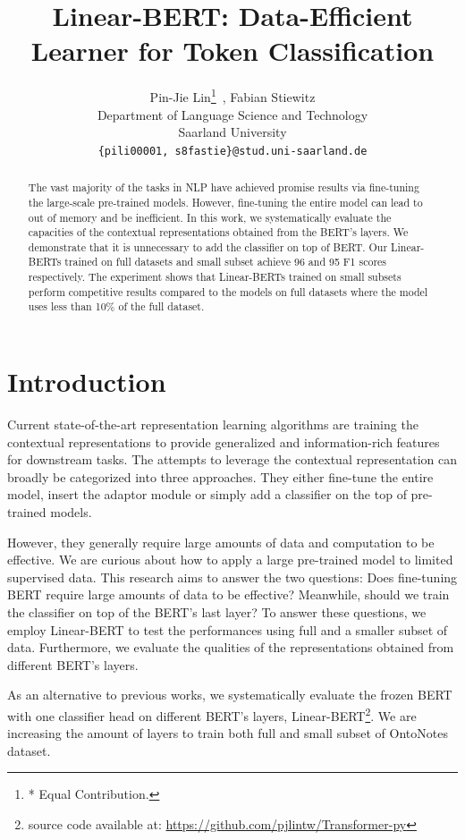 \documentclass[11pt,a4paper]{article}
\title{Linear-BERT: Data-Efficient Learner for Token Classification}
\author{Pin-Jie Lin\thanks{* Equal Contribution.}\ , Fabian Stiewitz\footnotemark[1] \\
  Department of Language Science and Technology \\
  Saarland University \\
  \texttt{\{pili00001, s8fastie\}@stud.uni-saarland.de}}
\date{}
\begin{document}
\maketitle
\begin{abstract}

The vast majority of the tasks in NLP have achieved promise results via fine-tuning the large-scale pre-trained models. However, fine-tuning the entire model can lead to out of memory and be inefficient. In this work, we systematically evaluate the capacities of the contextual representations obtained from the BERT's layers. We demonstrate that it is unnecessary to add the classifier on top of BERT. Our Linear-BERTs trained on full datasets and small subset achieve 96 and 95 F1 scores respectively. The experiment shows that Linear-BERTs trained on small subsets perform competitive results compared to the models on full datasets where the model uses less than 10\% of the full dataset.

\end{abstract}

\section{Introduction}

Current state-of-the-art representation learning algorithms are training the contextual representations to provide generalized and information-rich features for downstream tasks. The attempts to leverage the contextual representation can broadly be categorized into three approaches. They either fine-tune the entire model, insert the adaptor module or simply add a classifier on the top of pre-trained models. 

However, they generally require large amounts of data and computation to be effective. We are curious about how to apply a large pre-trained model to limited supervised data. This research aims to answer the two questions: Does fine-tuning BERT require large amounts of data to be effective? Meanwhile, should we train the classifier on top of the BERT's last layer? To answer these questions, we employ Linear-BERT to test the performances using full and a smaller subset of data. Furthermore, we evaluate the qualities of the representations obtained from different BERT's layers. 

As an alternative to previous works, we systematically evaluate the frozen BERT with one classifier head on different BERT's layers, Linear-BERT\footnote{source code available at: \url{https://github.com/pjlintw/Transformer-py}}. We are increasing the amount of layers to train both full and small subset of OntoNotes dataset. 
\end{document}
